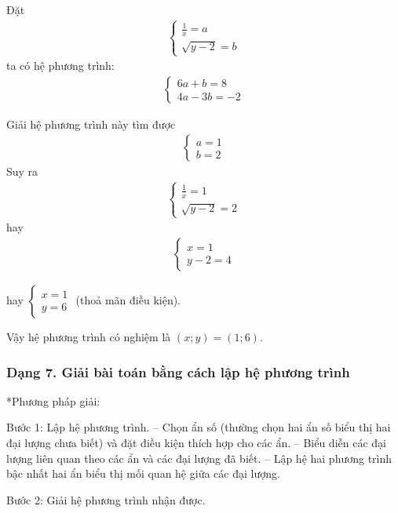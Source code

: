 \documentclass[%
    fontsize=12pt,%
    chapterprefix=false,%
    open=right,%
    twoside=false,%
    numbers=noenddot,%
    headings=optiontohead,%
    final,%
    DIV=15,%
    parskip=half %
]{scrbook}
\begin{document}
Đặt \begin{align*} \begin{cases} \frac{1}{x} = a \\ \sqrt{y - 2} = b \end{cases} \end{align*} ta có hệ phương trình: \begin{align*} \begin{cases} 6a + b = 8 \\ 4a - 3b = -2 \end{cases} \end{align*}

Giải hệ phương trình này tìm được \begin{align*} \begin{cases} a = 1 \\ b = 2 \end{cases} \end{align*} Suy ra \begin{align*} \begin{cases} \frac{1}{x} = 1 \\ \sqrt{y - 2} = 2 \end{cases} \end{align*} hay \begin{align*} \begin{cases} x = 1 \\ y - 2 = 4 \end{cases} \end{align*}


hay $ \begin{cases} x = 1 \\ y = 6 \end{cases} $ (thoả mãn điều kiện).

Vậy hệ phương trình có nghiệm là $ (x; y) = (1; 6) $.
\subsubsection{Dạng 7. Giải bài toán bằng cách lập hệ phương trình}

*Phương pháp giải:

Bước 1: Lập hệ phương trình. -- Chọn ẩn số (thường chọn hai ẩn số biểu thị hai đại lượng chưa biết) và đặt điều kiện thích hợp cho các ẩn. -- Biểu diễn các đại lượng liên quan theo các ẩn và các đại lượng đã biết. -- Lập hệ hai phương trình bậc nhất hai ẩn biểu thị mối quan hệ giữa các đại lượng.

Bước 2: Giải hệ phương trình nhận được.
\end{document}
